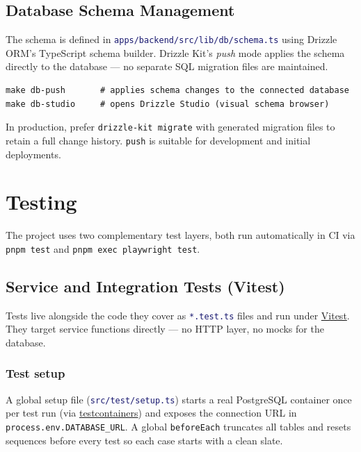 \documentclass[12pt,a4paper,twoside]{report}
\newcommand{\warnbox}[1]{\begin{tcolorbox}[warnboxstyle]#1\end{tcolorbox}}
\newcommand{\code}[1]{\texttt{#1}}
\newcommand{\file}[1]{\texttt{\textcolor{MidnightBlue}{#1}}}
\begin{document}
\section{Database Schema Management}
\label{sec:dbmigrations}

The schema is defined in \file{apps/backend/src/lib/db/schema.ts} using
Drizzle ORM's TypeScript schema builder. Drizzle Kit's \emph{push} mode
applies the schema directly to the database — no separate SQL migration
files are maintained.

\begin{lstlisting}[style=bash]
make db-push       # applies schema changes to the connected database
make db-studio     # opens Drizzle Studio (visual schema browser)
\end{lstlisting}

\warnbox{In production, prefer \code{drizzle-kit migrate} with generated
migration files to retain a full change history. \code{push} is
suitable for development and initial deployments.}

\chapter{Testing}
\label{ch:testing}

The project uses two complementary test layers, both run automatically
in CI via \code{pnpm test} and \code{pnpm exec playwright test}.

\section{Service and Integration Tests (Vitest)}
\label{sec:unit-tests}

Tests live alongside the code they cover as \file{*.test.ts} files and
run under \href{https://vitest.dev}{Vitest}. They target service
functions directly — no HTTP layer, no mocks for the database.

\subsection*{Test setup}

A global setup file (\file{src/test/setup.ts}) starts a real
PostgreSQL container once per test run (via
\href{https://node.testcontainers.org}{testcontainers}) and exposes
the connection URL in \code{process.env.DATABASE\_URL}.  A global
\code{beforeEach} truncates all tables and resets sequences before
every test so each case starts with a clean slate.
\end{document}
